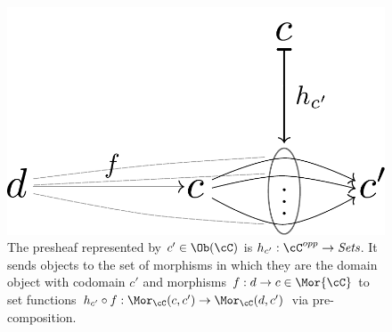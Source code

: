 \begin{frame}
\begin{figure}
\noindent\includegraphics[width=0.7\framewidth]{fig/hom.pdf}
\caption{The presheaf represented by $c' \in \Ob(\cC)$ is $h_{c'} : \cC^{opp} \rightarrow \textit{Sets}$. It sends objects to the set of morphisms in which they are the domain object with codomain $c'$ and morphisms $f:d \rightarrow c \in \Mor{\cC}$ to set functions $h_{c'} \circ f: \Mor_{\cC}(c,c') \rightarrow \Mor_{\cC}(d,c')$ via pre-composition.}
\label{fig:hom}
\end{figure}
\end{frame}